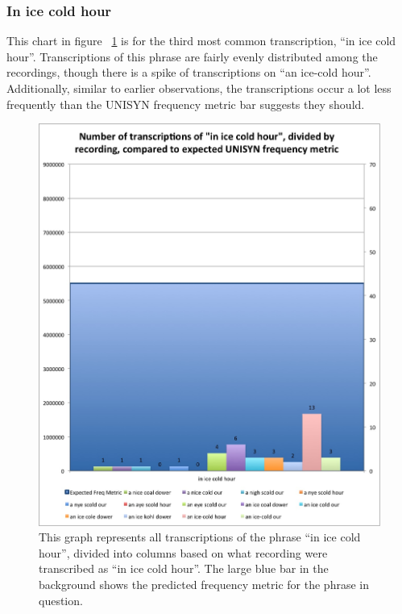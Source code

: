 \subsubsection{In ice cold hour}
\label{results:transcriptionCountPerRecording:in_ice_cold_hour}

This chart in figure ~\ref{fig:results:transcriptionCountPerRecordingInIceColdHour} is for the third most common transcription, ``in ice cold hour''.  Transcriptions of this phrase are fairly evenly distributed among the recordings, though there is a spike of transcriptions on  ``an ice-cold hour''.  Additionally, similar to earlier observations, the transcriptions occur a lot less frequently than the UNISYN frequency metric bar suggests they should.

\begin{figure}
\includegraphics[width=\textwidth]{TranscriptionCountPerRecording_inIceColdHour.jpg}
\captionfonts
\caption[Transcription Count Per Recording for the transcribed phrase ``in ice cold hour'']{ This graph represents all transcriptions of the phrase ``in ice cold hour'', divided into columns based on what recording were transcribed as ``in ice cold hour''. The large blue bar in the background shows the predicted frequency metric for the phrase in question.}
\label{fig:results:transcriptionCountPerRecordingInIceColdHour}
\end{figure}



